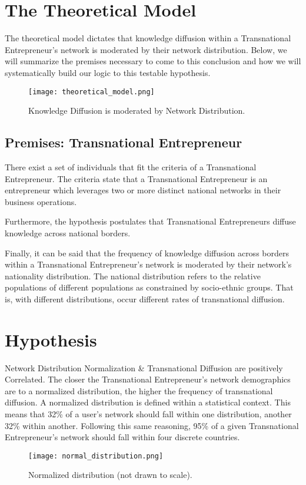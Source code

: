 \section{The Theoretical Model}
The theoretical model dictates that knowledge diffusion within a
Transnational Entrepreneur's network is moderated by their network
distribution. Below, we will summarize the premises necessary to come
to this conclusion and how we will systematically build our logic to
this testable hypothesis.

\begin{figure}[!ht]
  \centering
  \texttt{[image: theoretical\_model.png]}
  \caption{Knowledge Diffusion is moderated by Network Distribution.}
\end{figure}

\subsection{Premises: Transnational Entrepreneur}
There exist a set of individuals that fit the criteria of a
Transnational Entrepreneur. The criteria state that a Transnational
Entrepreneur is an entrepreneur which leverages two or more distinct
national networks in their business operations.

Furthermore, the hypothesis postulates that Transnational
Entrepreneurs diffuse knowledge across national borders.

Finally, it can be said that the frequency of knowledge diffusion
across borders within a Transnational Entrepreneur's network is
moderated by their network's nationality distribution. The national
distribution refers to the relative populations of different
populations as constrained by socio-ethnic groups. That is, with
different distributions, occur different rates of transnational
diffusion.

\section{Hypothesis}
Network Distribution Normalization \& Transnational Diffusion are
positively Correlated. The closer the Transnational Entrepreneur's
network demographics are to a normalized distribution, the higher the
frequency of transnational diffusion. A normalized distribution is
defined within a statistical context. This means that 32\% of a user's
network should fall within one distribution, another 32\% within
another. Following this same reasoning, 95\% of a given Transnational
Entrepreneur's network should fall within four discrete countries.
\begin{figure}[H]
  \centering
  \texttt{[image: normal\_distribution.png]}
  \caption{Normalized distribution (not drawn to scale).}
\end{figure}


